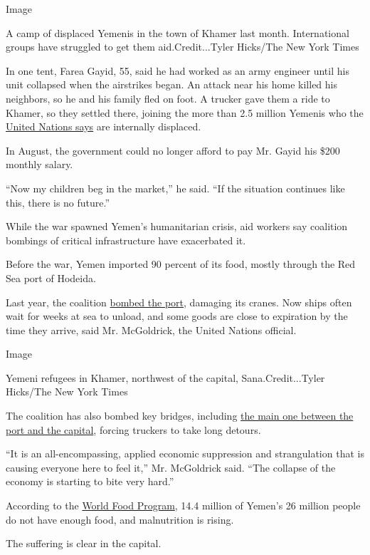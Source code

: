 Image

A camp of displaced Yemenis in the town of Khamer last month.
International groups have struggled to get them aid.Credit...Tyler
Hicks/The New York Times

In one tent, Farea Gayid, 55, said he had worked as an army engineer
until his unit collapsed when the airstrikes began. An attack near his
home killed his neighbors, so he and his family fled on foot. A trucker
gave them a ride to Khamer, so they settled there, joining the more than
2.5 million Yemenis who the
\href{http://reporting.unhcr.org/node/2647\#_ga=1.211671634.657052128.1471022517}{United
Nations says} are internally displaced.

In August, the government could no longer afford to pay Mr. Gayid his
\$200 monthly salary.

``Now my children beg in the market,'' he said. ``If the situation
continues like this, there is no future.''

While the war spawned Yemen's humanitarian crisis, aid workers say
coalition bombings of critical infrastructure have exacerbated it.

Before the war, Yemen imported 90 percent of its food, mostly through
the Red Sea port of Hodeida.

Last year, the coalition
\href{http://www.reuters.com/article/us-yemen-security-idUSKCN0QN0HX20150819}{bombed
the port}, damaging its cranes. Now ships often wait for weeks at sea to
unload, and some goods are close to expiration by the time they arrive,
said Mr. McGoldrick, the United Nations official.

Image

Yemeni refugees in Khamer, northwest of the capital, Sana.Credit...Tyler
Hicks/The New York Times

The coalition has also bombed key bridges, including
\href{https://twitter.com/AmbassadorPower/status/765682969520418817}{the
main one between the port and the capital}, forcing truckers to take
long detours.

``It is an all-encompassing, applied economic suppression and
strangulation that is causing everyone here to feel it,'' Mr. McGoldrick
said. ``The collapse of the economy is starting to bite very hard.''

According to the \href{https://www.wfp.org/countries/yemen}{World Food
Program}, 14.4 million of Yemen's 26 million people do not have enough
food, and malnutrition is rising.

The suffering is clear in the capital.

